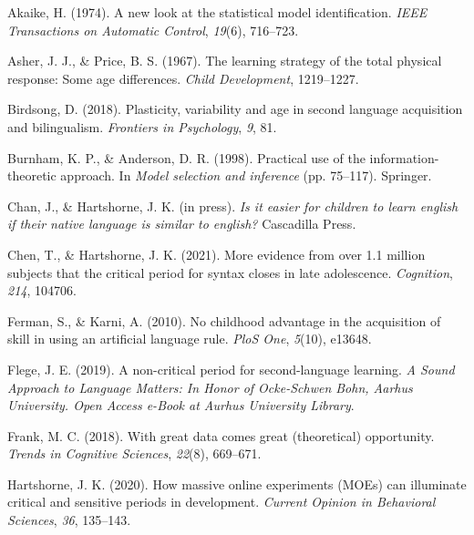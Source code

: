 \documentclass[
  english,
  doc,floatsintext]{apa6}
\newlength{\cslhangindent}
\newlength{\cslentryspacingunit} %
\newenvironment{CSLReferences}[2] %
 {%
  \setlength{\parindent}{0pt}
  \ifodd #1
  \let\oldpar\par
  \def\par{\hangindent=\cslhangindent\oldpar}
  \fi
  \setlength{\parskip}{#2\cslentryspacingunit}
 }%
 {}
\begin{document}
\hypertarget{refs}{}
\begin{CSLReferences}{1}{0}
\leavevmode{}%
Akaike, H. (1974). A new look at the statistical model identification. \emph{IEEE Transactions on Automatic Control}, \emph{19}(6), 716--723.

\leavevmode{}%
Asher, J. J., \& Price, B. S. (1967). The learning strategy of the total physical response: Some age differences. \emph{Child Development}, 1219--1227.

\leavevmode{}%
Birdsong, D. (2018). Plasticity, variability and age in second language acquisition and bilingualism. \emph{Frontiers in Psychology}, \emph{9}, 81.

\leavevmode{}%
Burnham, K. P., \& Anderson, D. R. (1998). Practical use of the information-theoretic approach. In \emph{Model selection and inference} (pp. 75--117). Springer.

\leavevmode{}%
Chan, J., \& Hartshorne, J. K. (in press). \emph{Is it easier for children to learn english if their native language is similar to english?} Cascadilla Press.

\leavevmode{}%
Chen, T., \& Hartshorne, J. K. (2021). More evidence from over 1.1 million subjects that the critical period for syntax closes in late adolescence. \emph{Cognition}, \emph{214}, 104706.

\leavevmode{}%
Ferman, S., \& Karni, A. (2010). No childhood advantage in the acquisition of skill in using an artificial language rule. \emph{PloS One}, \emph{5}(10), e13648.

\leavevmode{}%
Flege, J. E. (2019). A non-critical period for second-language learning. \emph{A Sound Approach to Language Matters: In Honor of Ocke-Schwen Bohn, Aarhus University. Open Access e-Book at Aurhus University Library}.

\leavevmode{}%
Frank, M. C. (2018). With great data comes great (theoretical) opportunity. \emph{Trends in Cognitive Sciences}, \emph{22}(8), 669--671.

\leavevmode{}%
Hartshorne, J. K. (2020). How massive online experiments (MOEs) can illuminate critical and sensitive periods in development. \emph{Current Opinion in Behavioral Sciences}, \emph{36}, 135--143.


\end{CSLReferences}
\end{document}
